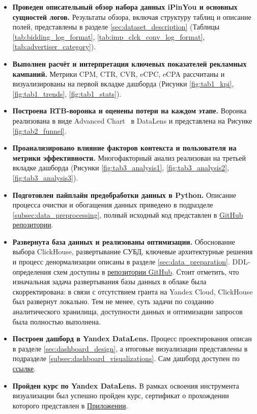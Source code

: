 \begin{itemize}
    \item \textbf{Проведен описательный обзор набора данных iPinYou и основных сущностей логов.} Результаты обзора, включая структуру таблиц и описание полей, представлены в разделе \ref{sec:dataset_description} (Таблицы \ref{tab:bidding_log_format}, \ref{tab:imp_clck_conv_log_format}, \ref{tab:advertiser_category}).
    \item \textbf{Выполнен расчёт и интерпретация ключевых показателей рекламных кампаний.} Метрики CPM, CTR, CVR, eCPC, eCPA рассчитаны и визуализированы на первой вкладке дашборда (Рисунки \ref{fig:tab1_kpi}, \ref{fig:tab1_trends}, \ref{fig:tab1_stats}).
    \item \textbf{Построена RTB-воронка и оценены потери на каждом этапе.} Воронка реализована в виде Advanced Chart~\cite{datalens-advanced-charts} в DataLens и представлена на Рисунке \ref{fig:tab2_funnel}.
    \item \textbf{Проанализировано влияние факторов контекста и пользователя на метрики эффективности.} Многофакторный анализ реализован на третьей вкладке дашборда (Рисунки \ref{fig:tab3_analysis1}, \ref{fig:tab3_analysis2}, \ref{fig:tab3_analysis3}).
    \item \textbf{Подготовлен пайплайн предобработки данных в Python.} Описание процесса очистки и обогащения данных приведено в подразделе \ref{subsec:data_preprocessing}, полный исходный код представлен в \href{https://github.com/wqrxssq/CourseWork}{GitHub репозитории}.
    \item \textbf{Развернута база данных и реализованы оптимизации.} Обоснование выбора ClickHouse, развертывание СУБД, ключевые архитектурные решения и процесс денормализации описаны в разделе \ref{sec:data_preparation}. DDL-определения схем доступны в \href{https://github.com/wqrxssq/CourseWork}{репозитории GitHub}. Стоит отметить, что изначальная задача развертывания базы данных в облаке была скорректирована: в связи с отсутствием гранта на Yandex Cloud, ClickHouse был развернут локально. Тем не менее, суть задачи по созданию аналитического хранилища, доступности данных и оптимизации запросов была полностью выполнена.
    \item \textbf{Построен дашборд в Yandex DataLens.} Процесс проектирования описан в разделе \ref{sec:dashboard_design}, а итоговые визуализации представлены в подразделе \ref{subsec:dashboard_visualizations}. Сам дашборд доступен по \href{https://datalens.yandex/ekzq1ggrjl24y}{ссылке}.
    \item \textbf{Пройден курс по Yandex DataLens.} В рамках освоения инструмента визуализации был успешно пройден курс, сертификат о прохождении которого представлен в \hyperref[sec:appendix]{Приложении}.
\end{itemize}

